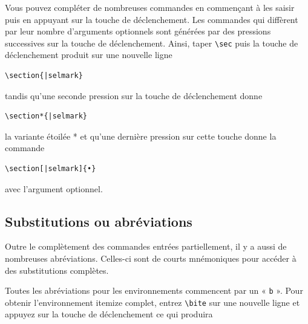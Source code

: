 \documentclass[11pt,french]{article}
\newcommand{\cmd}[1]{\textsf{#1}}
\begin{document}
Vous pouvez compléter de nombreuses commandes en commençant à les saisir puis en appuyant sur la touche de déclenchement. Les commandes qui diffèrent par leur nombre d'arguments optionnels sont générées par des pressions successives sur la touche de déclenchement. Ainsi, taper \verb|\sec| puis la touche de déclenchement produit sur une nouvelle ligne

\begin{verbatim}
\section{|selmark}
\end{verbatim}
tandis qu'une seconde pression sur la touche de déclenchement donne
\begin{verbatim}
\section*{|selmark}
\end{verbatim}
la variante étoilée * et qu'une dernière pression sur cette touche donne la commande
\begin{verbatim}
\section[|selmark]{•}
\end{verbatim}
avec l'argument optionnel.

\subsection{Substitutions ou abréviations}

Outre le complètement des commandes entrées partiellement, il y a aussi de nombreuses abréviations. Celles-ci sont de courts mnémoniques pour accéder à des substitutions complètes.

Toutes les abréviations pour les environnements commencent par un « \texttt{b} ». Pour obtenir l'environnement  \cmd{itemize} complet, entrez \verb|\bite| sur une nouvelle ligne et appuyez sur la touche de déclenchement ce qui produira
\end{document}
